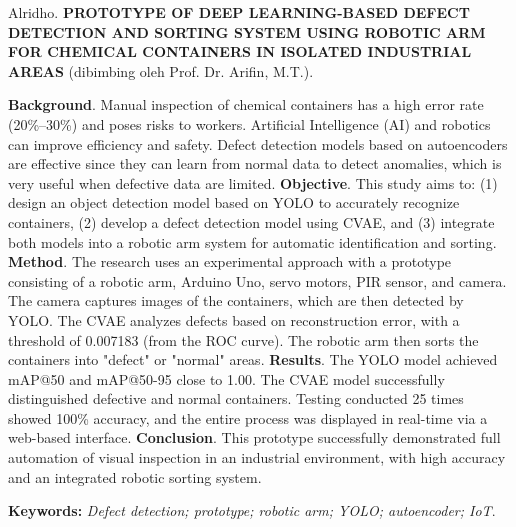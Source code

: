 \noindent
Alridho. \textbf{PROTOTYPE OF DEEP LEARNING-BASED DEFECT DETECTION AND SORTING SYSTEM USING ROBOTIC ARM FOR CHEMICAL CONTAINERS IN ISOLATED INDUSTRIAL AREAS} (dibimbing oleh Prof. Dr. Arifin, M.T.). \par

\vspace*{0.1cm}
 
\noindent
\textbf{Background}. Manual inspection of chemical containers has a high error rate (20\%–30\%) and poses risks to workers. Artificial Intelligence (AI) and robotics can improve efficiency and safety. Defect detection models based on autoencoders are effective since they can learn from normal data to detect anomalies, which is very useful when defective data are limited. \textbf{Objective}. This study aims to: (1) design an object detection model based on YOLO to accurately recognize containers, (2) develop a defect detection model using CVAE, and (3) integrate both models into a robotic arm system for automatic identification and sorting. \textbf{Method}. The research uses an experimental approach with a prototype consisting of a robotic arm, Arduino Uno, servo motors, PIR sensor, and camera. The camera captures images of the containers, which are then detected by YOLO. The CVAE analyzes defects based on reconstruction error, with a threshold of 0.007183 (from the ROC curve). The robotic arm then sorts the containers into "defect" or "normal" areas. \textbf{Results}. The YOLO model achieved mAP@50 and mAP@50-95 close to 1.00. The CVAE model successfully distinguished defective and normal containers. Testing conducted 25 times showed 100\% accuracy, and the entire process was displayed in real-time via a web-based interface. \textbf{Conclusion}. This prototype successfully demonstrated full automation of visual inspection in an industrial environment, with high accuracy and an integrated robotic sorting system.


\vspace*{0.1cm}

\noindent
\textbf{Keywords:} \textit{Defect detection; prototype; robotic arm; YOLO; autoencoder; IoT}.

\endgroup
